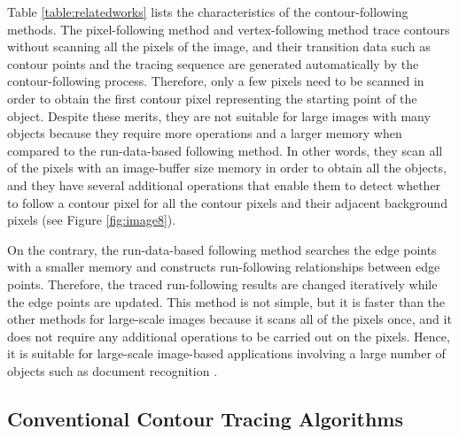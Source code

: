 Table \ref{table:relatedworks} lists the characteristics of the contour-following methods. The pixel-following method and vertex-following method trace contours without scanning all the pixels of the image, and their transition data such as contour points and the tracing sequence are generated automatically by the contour-following process. Therefore, only a few pixels need to be scanned in order to obtain the first contour pixel representing the starting point of the object. Despite these merits, they are not suitable for large images with many objects because they require more operations and a larger memory when compared to the run-data-based following method. In other words, they scan all of the pixels with an image-buffer size memory in order to obtain all the objects, and they have several additional operations that enable them to detect whether to follow a contour pixel for all the contour pixels and their adjacent background pixels (see Figure \ref{fig:image8}). 


On the contrary, the run-data-based following method searches the edge points with a smaller memory and constructs run-following relationships between edge points. Therefore, the traced run-following results are changed iteratively while the edge points are updated. This method is not simple, but it is faster than the other methods for large-scale images because it scans all of the pixels once, and it does not require any additional operations to be carried out on the pixels. Hence, it is suitable for large-scale image-based applications involving a large number of objects such as document recognition \cite{Miyatake1997Contour}.

\subsection{Conventional Contour Tracing Algorithms}

